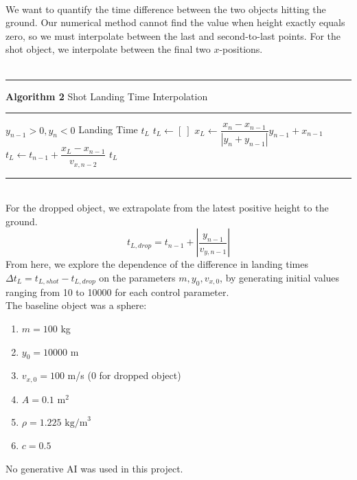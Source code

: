 \documentclass{article}
\begin{document}
	\\\indent We want to quantify the time difference between the two objects hitting the ground. Our numerical method cannot find the value when height exactly equals zero, so we must interpolate between the last and second-to-last points. For the shot object, we interpolate between the final two $x$-positions.
	\\\\
	\begin{minipage}{1\linewidth}
		\rule{\linewidth}{0.5pt}
		\textbf{Algorithm 2} Shot Landing Time Interpolation
		
		\vspace{-0.5em}
		\rule{\linewidth}{0.5pt}
		
		\begin{algorithmic}
			\Require $y_{n-1}>0,y_n<0$
			\Ensure Landing Time $t_L$
			\State $t_L\gets[~]$
			\State $x_{L}\gets\dfrac{x_{n}-x_{n-1}}{|y_n+y_{n-1}|}y_{n-1}+x_{n-1}$
			\State $t_L\gets t_{n-1}+\dfrac{x_L-x_{n-1}}{v_{x,n-2}}$
			\State \Return $t_L$
		\end{algorithmic}		
		\rule{\linewidth}{0.5pt}
		\vspace{0.25mm}
	\end{minipage}
	\\ \indent For the dropped object, we extrapolate from the latest positive height to the ground.
	\[t_{L,drop}=t_{n-1}+|\dfrac{y_{n-1}}{v_{y,n-1}}|\]
	From here, we explore the dependence of the difference in landing times $\Delta t_L=t_{L,shot}-t_{L,drop}$ on the parameters $m,y_0,v_{x,0}$, by generating initial values ranging from 10 to 10000 for each control parameter.
	\\ \indent The baseline object was a sphere:
	\begin{enumerate}
		\item $m=100$ kg
		\item $y_0 = 10000$ m
		\item $v_{x,0} = 100$ m/s (0 for dropped object)
		\item $A=0.1\text{ m}^2$
		\item $\rho=1.225\text{ kg/m}^3$
		\item $c=0.5$
	\end{enumerate}
	\indent No generative AI was used in this project.
\end{document}
